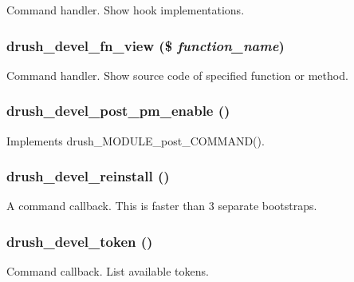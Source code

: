 \label{devel_8drush_8inc_a8e43e93a1b9979d8235af2458d1ba830}
Command handler. Show hook implementations. \hypertarget{devel_8drush_8inc_aed8e15eae08ad844d59dce748251a251}{
\subsubsection[{drush\_\-devel\_\-fn\_\-view}]{\setlength{\rightskip}{0pt plus 5cm}drush\_\-devel\_\-fn\_\-view (\$ {\em function\_\-name})}}
\label{devel_8drush_8inc_aed8e15eae08ad844d59dce748251a251}
Command handler. Show source code of specified function or method. \hypertarget{devel_8drush_8inc_a3266fbcda100b3e6d00f77813e0f26b8}{
\subsubsection[{drush\_\-devel\_\-post\_\-pm\_\-enable}]{\setlength{\rightskip}{0pt plus 5cm}drush\_\-devel\_\-post\_\-pm\_\-enable ()}}
\label{devel_8drush_8inc_a3266fbcda100b3e6d00f77813e0f26b8}
Implements drush\_\-MODULE\_\-post\_\-COMMAND(). \hypertarget{devel_8drush_8inc_a86a559aeffa121938873c0aaa054290a}{
\subsubsection[{drush\_\-devel\_\-reinstall}]{\setlength{\rightskip}{0pt plus 5cm}drush\_\-devel\_\-reinstall ()}}
\label{devel_8drush_8inc_a86a559aeffa121938873c0aaa054290a}
A command callback. This is faster than 3 separate bootstraps. \hypertarget{devel_8drush_8inc_ad8cf2a6701b49dac235bc6d721795e30}{
\subsubsection[{drush\_\-devel\_\-token}]{\setlength{\rightskip}{0pt plus 5cm}drush\_\-devel\_\-token ()}}
\label{devel_8drush_8inc_ad8cf2a6701b49dac235bc6d721795e30}
Command callback. List available tokens. 